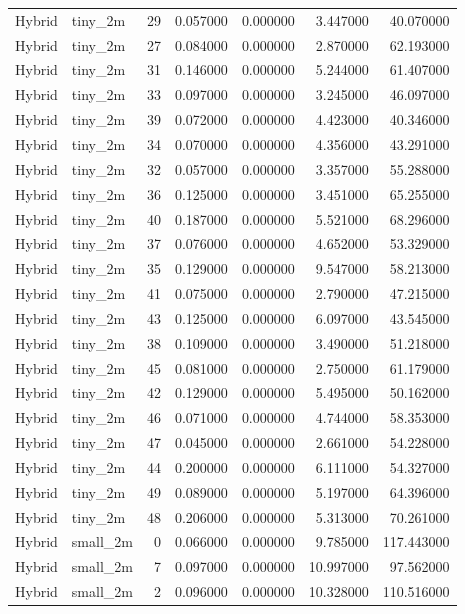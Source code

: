 \begin{tabular}{llrrrrr}
Hybrid & tiny_2m & 29 & 0.057000 & 0.000000 & 3.447000 & 40.070000 \\
Hybrid & tiny_2m & 27 & 0.084000 & 0.000000 & 2.870000 & 62.193000 \\
Hybrid & tiny_2m & 31 & 0.146000 & 0.000000 & 5.244000 & 61.407000 \\
Hybrid & tiny_2m & 33 & 0.097000 & 0.000000 & 3.245000 & 46.097000 \\
Hybrid & tiny_2m & 39 & 0.072000 & 0.000000 & 4.423000 & 40.346000 \\
Hybrid & tiny_2m & 34 & 0.070000 & 0.000000 & 4.356000 & 43.291000 \\
Hybrid & tiny_2m & 32 & 0.057000 & 0.000000 & 3.357000 & 55.288000 \\
Hybrid & tiny_2m & 36 & 0.125000 & 0.000000 & 3.451000 & 65.255000 \\
Hybrid & tiny_2m & 40 & 0.187000 & 0.000000 & 5.521000 & 68.296000 \\
Hybrid & tiny_2m & 37 & 0.076000 & 0.000000 & 4.652000 & 53.329000 \\
Hybrid & tiny_2m & 35 & 0.129000 & 0.000000 & 9.547000 & 58.213000 \\
Hybrid & tiny_2m & 41 & 0.075000 & 0.000000 & 2.790000 & 47.215000 \\
Hybrid & tiny_2m & 43 & 0.125000 & 0.000000 & 6.097000 & 43.545000 \\
Hybrid & tiny_2m & 38 & 0.109000 & 0.000000 & 3.490000 & 51.218000 \\
Hybrid & tiny_2m & 45 & 0.081000 & 0.000000 & 2.750000 & 61.179000 \\
Hybrid & tiny_2m & 42 & 0.129000 & 0.000000 & 5.495000 & 50.162000 \\
Hybrid & tiny_2m & 46 & 0.071000 & 0.000000 & 4.744000 & 58.353000 \\
Hybrid & tiny_2m & 47 & 0.045000 & 0.000000 & 2.661000 & 54.228000 \\
Hybrid & tiny_2m & 44 & 0.200000 & 0.000000 & 6.111000 & 54.327000 \\
Hybrid & tiny_2m & 49 & 0.089000 & 0.000000 & 5.197000 & 64.396000 \\
Hybrid & tiny_2m & 48 & 0.206000 & 0.000000 & 5.313000 & 70.261000 \\
Hybrid & small_2m & 0 & 0.066000 & 0.000000 & 9.785000 & 117.443000 \\
Hybrid & small_2m & 7 & 0.097000 & 0.000000 & 10.997000 & 97.562000 \\
Hybrid & small_2m & 2 & 0.096000 & 0.000000 & 10.328000 & 110.516000 \\

\end{tabular}
